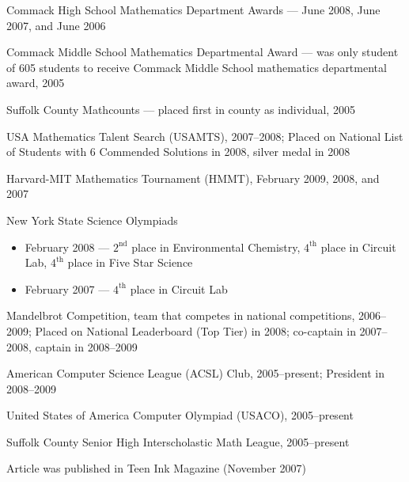 \documentclass [11pt]{res}
\begin{document}
\begin {itemize}
{\begin{itemize}
        \end{itemize}
      \item
        Commack High School Mathematics Department Awards --- June 2008, June 2007, and June 2006
      \item
        Commack Middle School Mathematics Departmental Award --- was only student of 605 students to receive Commack Middle School mathematics departmental award, 2005
      \item
        Suffolk County Mathcounts --- placed first in county as individual, 2005
      \item
        USA Mathematics Talent Search (USAMTS), 2007--2008; Placed on National List of Students with 6 Commended Solutions in 2008, silver medal in 2008
      \item
        Harvard-MIT Mathematics Tournament (HMMT), February 2009, 2008, and 2007
      \item
        New York State Science Olympiads
        \begin{itemize}
          \item
            February 2008 --- $2^\text{nd}$ place in Environmental Chemistry, $4^\text{th}$ place in Circuit Lab, $4^\text{th}$ place in Five Star Science
          \item
            February 2007 --- $4^\text{th}$ place in Circuit Lab
        \end{itemize}
      \item
        Mandelbrot Competition, team that competes in national competitions, 2006--2009; Placed on National Leaderboard (Top Tier) in 2008; co-captain in 2007--2008, captain in 2008--2009
      \item
        American Computer Science League (ACSL) Club, 2005--present; President in 2008--2009
      \item
        United States of America Computer Olympiad (USACO), 2005--present
      \item
        Suffolk County Senior High Interscholastic Math League, 2005--present
      \item
        Article was published in Teen Ink Magazine (November 2007)
      }
    \end{itemize}
\end{document}
